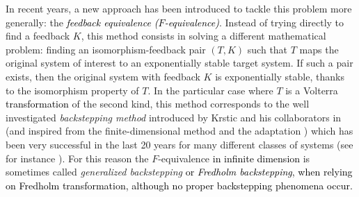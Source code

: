 \documentclass[11pt, dvipsnames]{amsart}
\begin{document}
In recent years, a new approach has been introduced to tackle this problem more generally: the 
\textcolor{black}{\emph{feedback equivalence ($F$-equivalence)}}. 
Instead of trying directly to find a feedback $K$, this method consists in solving a different mathematical problem: finding
an isomorphism-feedback pair $(T,K)$ such that $T$ maps the original system of interest to an exponentially stable target system. If such a pair exists, then the original system with feedback $K$ is exponentially stable, thanks to the isomorphism property of $T$. In the particular case where $T$ is a Volterra \textcolor{black}{transformation} of the second kind, this method corresponds to the well investigated \emph{backstepping method} introduced by Krstic and his collaborators in \cite{BaloghKrstic,BBK2003,KrsticBook} (and inspired from the finite-dimensional method \cite{backstepping1,backstepping2,backstepping3} and the adaptation \cite{backsteppingadapt}) which has been very successful in the last 20 years for many different classes of systems (see for instance \cite{hu2015control}). For this reason the $F$-equivalence \textcolor{black}{in infinite dimension} is sometimes called \emph{generalized backstepping} \textcolor{black}{or \emph{Fredholm backstepping}, when relying on Fredholm transformation, although no proper backstepping phenomena occur.}
\end{document}
